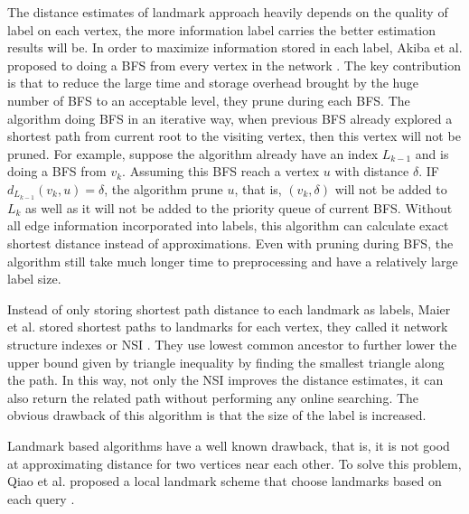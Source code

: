 The distance estimates of landmark approach heavily depends on the quality of label on each vertex, the more information label carries the better estimation results will be. In order to maximize information stored in each label, Akiba et al. proposed to doing a BFS from every vertex in the network \cite{Akiba:2013:FES:2463676.2465315}. The key contribution is that to reduce the large time and storage overhead brought by the huge number of BFS to an acceptable level, they prune during each BFS. The algorithm doing BFS in an iterative way, when previous BFS already explored a shortest path from current root to the visiting vertex, then this vertex will not be pruned. For example, suppose the algorithm already have an index $L_{k-1}$ and is doing a BFS from $v_k$. Assuming this BFS reach a vertex $u$ with distance $\delta$. IF $d_{L_{k-1}}(v_k,u) = \delta$, the algorithm prune $u$, that is, $(v_k,\delta)$ will not be added to $L_k$ as well as it will not be added to the priority queue of current BFS. Without all edge information incorporated into labels, this algorithm can calculate exact shortest distance instead of approximations. Even with pruning during BFS, the algorithm still take much longer time to preprocessing and have a relatively large label size.

Instead of only storing shortest path distance to each landmark as labels, Maier et al. stored shortest paths to landmarks for each vertex, they called it network structure indexes or NSI \cite{Maier:2011:INS:1993077.1993079}. They use lowest common ancestor to further lower the upper bound given by triangle inequality by finding the smallest triangle along the path. In this way, not only the NSI improves the distance estimates, it can also return the related path without performing any online searching. The obvious drawback of this algorithm is that the size of the label is increased. 

Landmark based algorithms have a well known drawback, that is, it is not good at approximating distance for two vertices near each other. To solve this problem, Qiao et al. proposed a local landmark scheme that choose landmarks based on each query \cite{6399472}.

